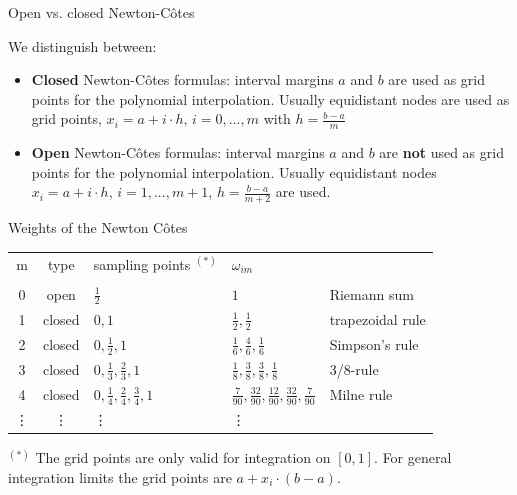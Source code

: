 \documentclass[11pt,compress,t,notes=noshow, xcolor=table]{beamer}
\begin{document}
\begin{vbframe}{Open vs. closed Newton-C\^{o}tes}

We distinguish between:

\begin{itemize}
\item \textbf{Closed} Newton-C\^{o}tes formulas: interval margins $a$ and $b$ are used as grid points for the polynomial interpolation. Usually equidistant nodes are used as grid points, $x_i = a + i \cdot h$, $i = 0, ..., m$ with $h = \frac{b - a}{m}$
\item \textbf{Open} Newton-C\^{o}tes formulas: interval margins $a$ and $b$ are \textbf{not} used as grid points for the polynomial interpolation. Usually equidistant nodes $x_i = a + i\cdot h$, $i = 1, ..., m + 1$, $h = \frac{b - a}{m + 2}$ are used.
\end{itemize}

\end{vbframe}

\begin{vbframe}{Weights of the Newton C\^{o}tes}

\begin{center}
\begin{table}
\small
\begin{tabular}{c c| l l l}
m & type & sampling points $^{(*)}$ & $\omega_{im}$ & \\
\\
0 & open & $\frac{1}{2}$ & $1$ & Riemann sum \\
1 & closed & $0, 1$ & $\frac{1}{2}, \frac{1}{2}$ & trapezoidal rule \\
2 & closed & $0, \frac{1}{2}, 1$ & $\frac{1}{6}, \frac{4}{6}, \frac{1}{6}$ & Simpson's rule \\
3 & closed & $0, \frac{1}{3}, \frac{2}{3}, 1$ & $\frac{1}{8}, \frac{3}{8}, \frac{3}{8}, \frac{1}{8}$ & 3/8-rule \\
4 & closed & $0, \frac{1}{4}, \frac{2}{4}, \frac{3}{4}, 1$ & $\frac{7}{90}, \frac{32}{90}, \frac{12}{90}, \frac{32}{90}, \frac{7}{90}$ & Milne rule \\
\vdots & \vdots & \vdots & \vdots &\\
\end{tabular}
\end{table}
\end{center}

\begin{footnotesize}
$^{(*)}$ The grid points are only valid for integration on $[0, 1]$. For general integration limits the grid points are $a + x_i \cdot (b - a)$.
\end{footnotesize}

\end{vbframe}
\end{document}
